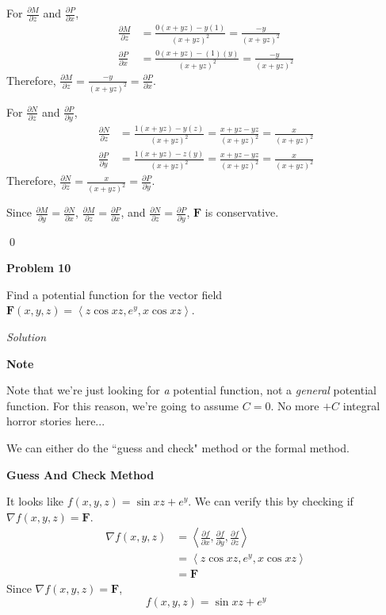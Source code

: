 \documentclass{article}
\newcommand{\lra}[1]{\left\langle #1 \right\rangle}
\newcommand{\F}[0]{\mathbf{F}}
\newcommand{\Solution}{\textit{Solution}}
\begin{document}
{}
For $\displaystyle \frac{\partial M}{\partial z}$ and $\displaystyle\frac{\partial P}{\partial x}$,
\begin{align*}
    \frac{\partial M}{\partial z}&=\frac{0(x+yz)-y(1)}{(x+yz)^2}=\frac{-y}{(x+yz)^2}\\
    \frac{\partial P}{\partial x}&=\frac{0(x+yz)-(1)(y)}{(x+yz)^2}=\frac{-y}{(x+yz)^2}
\end{align*}
Therefore, $\displaystyle \frac{\partial M}{\partial z}=\frac{-y}{(x+yz)^2}=\frac{\partial P}{\partial x}$.

{}
For $\displaystyle \frac{\partial N}{\partial z}$ and $\displaystyle\frac{\partial P}{\partial y}$,
\begin{align*}
    \frac{\partial N}{\partial z}&=\frac{1(x+yz)-y(z)}{(x+yz)^2}=\frac{x+yz-yz}{(x+yz)^2}=\frac{x}{(x+yz)^2}\\
    \frac{\partial P}{\partial y}&=\frac{1(x+yz)-z(y)}{(x+yz)^2}=\frac{x+yz-yz}{(x+yz)^2}=\frac{x}{(x+yz)^2}
\end{align*}
Therefore, $\displaystyle \frac{\partial N}{\partial z}=\frac{x}{(x+yz)^2}=\frac{\partial P}{\partial y}$.

Since $\displaystyle \frac{\partial M}{\partial y}=\frac{\partial N}{\partial x}$, $\displaystyle \frac{\partial M}{\partial z}=\frac{\partial P}{\partial x}$, and $\displaystyle \frac{\partial N}{\partial z}=\frac{\partial P}{\partial y}$, $\F$ is conservative.

\qed

\newpage
{}
{}\textbf{Problem 10}

Find a potential function for the vector field $\F(x,y,z)=\lra{z\cos xz,e^y,x\cos xz}$.

\Solution

\textbf{Note}

Note that we're just looking for \textit{a} potential function, not a \textit{general} potential function. For this reason, we're going to assume $C=0$. No more $+C$ integral horror stories here...

We can either do the ``guess and check" method or the formal method.

{}\textbf{Guess And Check Method}

It looks like $f(x,y,z)=\sin xz + e^y$. We can verify this by checking if $\nabla f(x,y,z)=\F$.
\begin{align*}
    \nabla f(x,y,z)&=\lra{\frac{\partial f}{\partial x}, \frac{\partial f}{\partial y}, \frac{\partial f}{\partial z}}\\
    &=\lra{z\cos xz, e^y, x\cos xz}\\
    &=\F
\end{align*}
Since $\nabla f(x,y,z)=\F$,
\begin{equation*}
    \boxed{f(x,y,z)=\sin xz+e^y}
\end{equation*}
\end{document}

